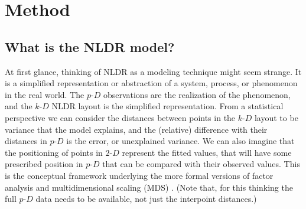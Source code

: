 \documentclass[
  12pt]{article}
\newcommand\pD{$p\text{-}D$}
\newcommand\kD{$k\text{-}D$}
\newcommand\gD{$2\text{-}D$}
\begin{document}
\section{Method}\label{sec-method}

\subsection{What is the NLDR model?}\label{what-is-the-nldr-model}

At first glance, thinking of NLDR as a modeling technique might seem
strange. It is a simplified representation or abstraction of a system,
process, or phenomenon in the real world. The \pD{} observations are the
realization of the phenomenon, and the \kD{} NLDR layout is the
simplified representation. From a statistical perspective we can
consider the distances between points in the \kD{} layout to be variance
that the model explains, and the (relative) difference with their
distances in \pD{} is the error, or unexplained variance. We can also
imagine that the positioning of points in \gD{} represent the fitted
values, that will have some prescribed position in \pD{} that can be
compared with their observed values. This is the conceptual framework
underlying the more formal versions of factor analysis \citep{cfa69} and
multidimensional scaling (MDS) \citep{borg2005}. (Note that, for this
thinking the full \pD{} data needs to be available, not just the
interpoint distances.)
\end{document}
